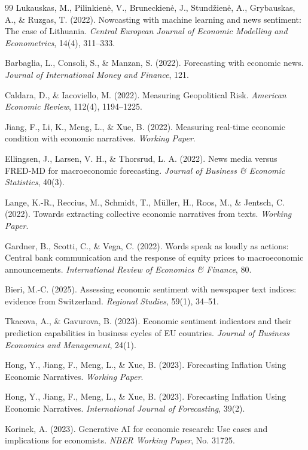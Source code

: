 \documentclass[11pt]{article}
\begin{document}
\begin{thebibliography}{99}
 Lukauskas, M., Pilinkienė, V., Bruneckienė, J., Stundžienė, A., Grybauskas, A., \& Ruzgas, T. (2022). Nowcasting with machine learning and news sentiment: The case of Lithuania. \textit{Central European Journal of Economic Modelling and Econometrics}, 14(4), 311--333.

 Barbaglia, L., Consoli, S., \& Manzan, S. (2022). Forecasting with economic news. \textit{Journal of International Money and Finance}, 121.

 Caldara, D., \& Iacoviello, M. (2022). Measuring Geopolitical Risk. \textit{American Economic Review}, 112(4), 1194--1225.

 Jiang, F., Li, K., Meng, L., \& Xue, B. (2022). Measuring real-time economic condition with economic narratives. \textit{Working Paper}.

 Ellingsen, J., Larsen, V. H., \& Thorsrud, L. A. (2022). News media versus FRED-MD for macroeconomic forecasting. \textit{Journal of Business \& Economic Statistics}, 40(3).

 Lange, K.-R., Reccius, M., Schmidt, T., Müller, H., Roos, M., \& Jentsch, C. (2022). Towards extracting collective economic narratives from texts. \textit{Working Paper}.

 Gardner, B., Scotti, C., \& Vega, C. (2022). Words speak as loudly as actions: Central bank communication and the response of equity prices to macroeconomic announcements. \textit{International Review of Economics \& Finance}, 80.

 Bieri, M.-C. (2025). Assessing economic sentiment with newspaper text indices: evidence from Switzerland. \textit{Regional Studies}, 59(1), 34--51.

 Tkacova, A., \& Gavurova, B. (2023). Economic sentiment indicators and their prediction capabilities in business cycles of EU countries. \textit{Journal of Business Economics and Management}, 24(1).

 Hong, Y., Jiang, F., Meng, L., \& Xue, B. (2023). Forecasting Inflation Using Economic Narratives. \textit{Working Paper}.

 Hong, Y., Jiang, F., Meng, L., \& Xue, B. (2023). Forecasting Inflation Using Economic Narratives. \textit{International Journal of Forecasting}, 39(2).

 Korinek, A. (2023). Generative AI for economic research: Use cases and implications for economists. \textit{NBER Working Paper}, No. 31725.


\end{thebibliography}
\end{document}
